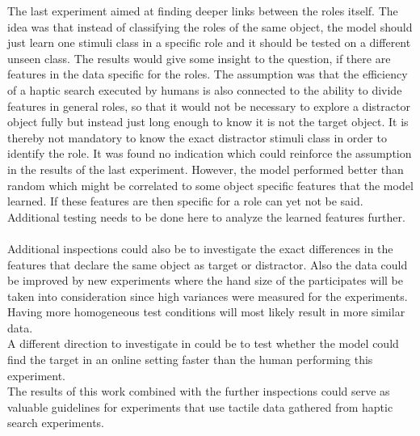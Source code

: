 The last experiment aimed at finding deeper links between the roles itself. The idea was that instead of classifying the roles of the same object, the model should just learn one stimuli class in a specific role and it should be tested on a different unseen class. The results would give some insight to the question, if there are features in the data specific for the roles. The assumption was that the efficiency of a haptic search executed by humans is also connected to the ability to divide features in general roles, so that it would not be necessary to explore a distractor object fully but instead just long enough to know it is not the target object. It is thereby not mandatory to know the exact distractor stimuli class in order to identify the role. It was found no indication which could reinforce the assumption in the results of the last experiment. However, the model performed better than random which might be correlated to some object specific features that the model learned. If these features are then specific for a role can yet not be said. Additional testing needs to be done here to analyze the learned features further.\\
\\

Additional inspections could also be to investigate the exact differences in the features that declare the same object as target or distractor. Also the data could be improved by new experiments where the hand size of the participates will be taken into consideration since high variances were measured for the experiments. Having more homogeneous test conditions will most likely result in more similar data. \\
A different direction to investigate in could be to test whether the model could find the target in an online setting faster than the human performing this experiment. \\
The results of this work combined with the further inspections could serve as valuable guidelines for experiments that use tactile data gathered from haptic search experiments.